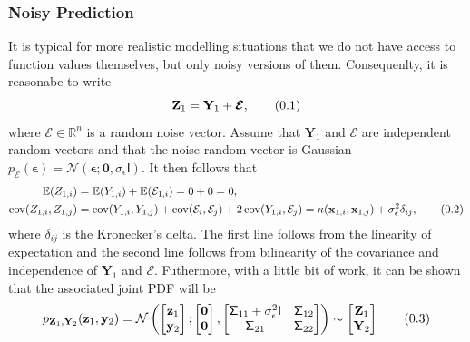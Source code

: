 \documentclass[10pt]{article}
\theoremstyle{definition}
\newcommand\eqnum{\addtocounter{equation}{1}\tag{\arabic{section}.\arabic{equation}}}
\DeclareMathOperator{\cov}{cov}
\begin{document}
\subsubsection{Noisy Prediction}
It is typical for more realistic modelling situations that we do not have access to function values themselves, but only noisy versions of them. Consequenlty, it is reasonabe to write
\begin{equation*}
\mathbf{Z}_{1} = \mathbf{Y}_{1} + \boldsymbol{\mathcal{E}},
\eqnum
\end{equation*}
where $\boldsymbol{\mathcal{E}}\in\mathbb{R}^n$ is a random noise vector. Assume that $\mathbf{Y}_1$ and $\boldsymbol{\mathcal{E}}$ are independent random vectors and that the noise random vector is Gaussian $p_{\boldsymbol{\mathcal{E}}}(\boldsymbol{\epsilon})=\mathcal{N}(\boldsymbol{\epsilon}; \mathbf{0}, \sigma_{\epsilon}\mathsf{I})$. It then follows that
 \begin{align*}
 \mathbb{E}(Z_{1,i}) &=  \mathbb{E}(Y_{1,i}) +  \mathbb{E}(\mathcal{E}_{1,i}) = 0 + 0 = 0, \\
 \cov(Z_{1,i},Z_{1,j}) &=  \cov(Y_{1,i},Y_{1,j}) +  \cov(\mathcal{E}_{i},\mathcal{E}_{j}) + 2 \cov(Y_{1,i},\mathcal{E}_{j}) = 
 \kappa(\mathbf{x}_{1,i}, \mathbf{x}_{1,j}) + \sigma_{\epsilon}^2\delta_{ij},
 \eqnum
 \end{align*}
where $\delta_{ij}$ is the Kronecker's delta. The first line follows from the linearity of expectation and the second line follows from bilinearity of the covariance and independence of $\mathbf{Y}_1$ and $\boldsymbol{\mathcal{E}}$. Futhermore, with a little bit of work, it can be shown that the associated joint PDF will be \cite[Sectoin 4.3]{Murphy2012}
\begin{equation*}
p_{\mathbf{Z}_{1}, \mathbf{Y}_{2}}(\mathbf{z}_{1}, \mathbf{y}_{2}) =
\mathcal{N} \left(
\begin{bmatrix}
\mathbf{z}_1 \\
\mathbf{y}_2
\end{bmatrix} ;
\begin{bmatrix}
\mathbf{0} \\
\mathbf{0}
\end{bmatrix} ,
\begin{bmatrix}
\mathsf{\Sigma}_{11}+\sigma_{\epsilon}^2\mathsf{I} & \mathsf{\Sigma}_{12} \\
\mathsf{\Sigma}_{21} & \mathsf{\Sigma}_{22} 
\end{bmatrix}
\right) \sim
\begin{bmatrix}
\mathbf{Z}_1 \\
\mathbf{Y}_2
\end{bmatrix}
\eqnum
\label{eq:GP:noise:joint}
\end{equation*}
\end{document}
